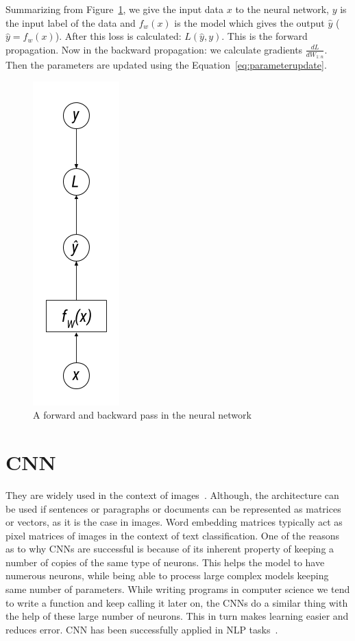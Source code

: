 Summarizing from Figure~\ref{fig:oneepoch}, we give the input data $x$ to the neural network, $y$ is the input label of the data and $f_w(x)$ is the model which gives the output $\hat{y}$ ($\hat{y} = f_w(x)$). After this loss is calculated: $L(\hat{y}, y)$. This is the forward propagation. 
Now in the backward  propagation: we calculate gradients $\frac{dL}{dW_{1:n}}$. Then the parameters are updated using the Equation~\ref{eq:parameterupdate}. 

\begin{figure}
    \centering
    \includegraphics[scale=0.5]{Figures/back-propagation.png}
    \caption{A forward and backward pass in the neural network}
    \label{fig:oneepoch}
\end{figure}



\section{CNN}\label{sec:cnn}
They are widely used in the context of images~\cite{krizhevsky2012imagenet}. Although, the architecture can be used if sentences or paragraphs or documents can be represented as matrices or vectors, as it is the case in images. Word embedding matrices typically act as pixel matrices of images in the context of text classification. One of the reasons as to why CNNs are successful is because of its inherent property of keeping a number of copies of the same type of neurons. This helps the model to have numerous neurons, while being able to process large complex models keeping same number of parameters. While writing programs in computer science we tend to write a function and keep calling it later on, the CNNs do a similar thing with the help of these large number of neurons. This in turn makes learning easier and reduces error. CNN has been successfully applied in NLP tasks~\cite{dos2014deep, zeng2014relation}. 

